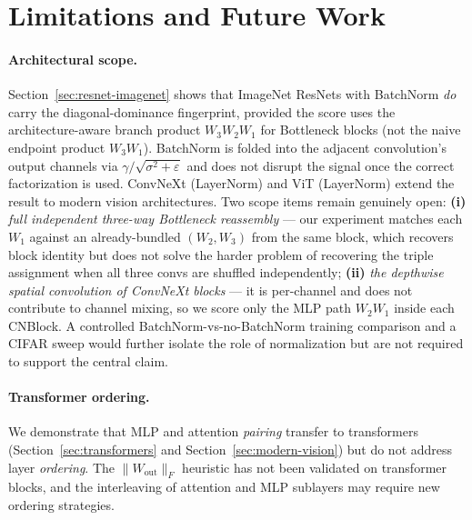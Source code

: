 \documentclass[10pt]{article}
\theoremstyle{remark}
\begin{document}
\section{Limitations and Future Work}\label{sec:limitations}

\paragraph{Architectural scope.} Section~\ref{sec:resnet-imagenet}
shows that ImageNet ResNets with BatchNorm \emph{do} carry the
diagonal-dominance fingerprint, provided the score uses the
architecture-aware branch product $W_3 W_2 W_1$ for Bottleneck blocks
(not the naive endpoint product $W_3 W_1$). BatchNorm is folded into
the adjacent convolution's output channels via $\gamma/\sqrt{\sigma^2+\varepsilon}$
and does not disrupt the signal once the correct factorization is used.
ConvNeXt (LayerNorm) and ViT (LayerNorm) extend the result to modern
vision architectures. Two scope items remain genuinely open:
\textbf{(i)} \emph{full independent three-way Bottleneck reassembly} ---
our experiment matches each $W_1$ against an already-bundled
$(W_2, W_3)$ from the same block, which recovers block identity but
does not solve the harder problem of recovering the triple assignment
when all three convs are shuffled independently;
\textbf{(ii)} \emph{the depthwise spatial convolution of ConvNeXt
blocks} --- it is per-channel and does not contribute to channel mixing,
so we score only the MLP path $W_2 W_1$ inside each CNBlock. A
controlled BatchNorm-vs-no-BatchNorm training comparison and a CIFAR
sweep would further isolate the role of normalization but are not
required to support the central claim.

\paragraph{Transformer ordering.} We demonstrate that MLP and attention
\emph{pairing} transfer to transformers (Section~\ref{sec:transformers}
and Section~\ref{sec:modern-vision}) but do not address layer
\emph{ordering}. The $\|W_{\mathrm{out}}\|_F$ heuristic has not been
validated on transformer blocks, and the interleaving of attention and
MLP sublayers may require new ordering strategies.
\end{document}
